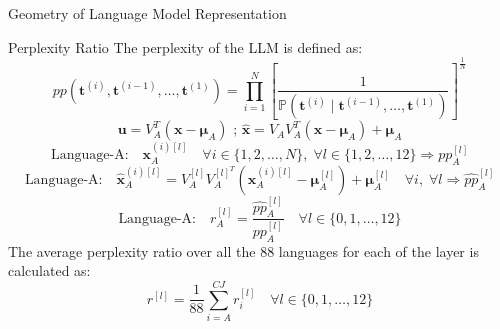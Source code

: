 \documentclass{beamer}
\begin{document}
	\begin{frame}{Geometry of Language Model Representation}
		\begin{block}{\scriptsize Perplexity Ratio}\scriptsize
			The perplexity of the LLM is defined as:
			\begin{equation}\label{E:pp}
				pp(\mathbf{t}^{(i)}, \mathbf{t}^{(i-1)}, \dots , \mathbf{t}^{(1)}) = \prod_{i = 1}^{N} \left[ \frac{1}{\mathbb{P}(\mathbf{t}^{(i)} \mid \mathbf{t}^{(i-1)}, \dots , \mathbf{t}^{(1)})} \right]^{\frac{1}{N}}
			\end{equation}		
			\begin{equation}
				\mathbf{u} = V_A^T(\mathbf{x} - \bm{\mu}_A) \text{    ;    } \hat{\mathbf{x}} = V_A V_A^T (\mathbf{x} - \bm{\mu}_A) + \bm{\mu}_A
			\end{equation}
			\begin{equation}
				\text{Language-A:} \quad \mathbf{x}_A^{(i)[l]} \quad \forall i \in \{1, 2, \dots, N\},\; \forall l \in \{1, 2, \dots, 12\} \Longrightarrow pp_A^{[l]} 
			\end{equation}
			\begin{equation}
				\text{Language-A:} \quad \hat{\mathbf{x}}_A^{(i)[l]} = V_A^{[l]} V_A^{[l]^T} (\mathbf{x}_A^{(i)[l]} - \bm{\mu}_A^{[l]}) + \bm{\mu}_A^{[l]}  \quad \forall i, \; \forall l \Longrightarrow \hat{pp}_{A}^{[l]}
			\end{equation}
			\begin{equation}
				\text{Language-A:} \quad r_A^{[l]} = \frac{\hat{pp}_A^{[l]}}{pp_A^{[l]}} \quad \forall l \in \{0, 1, \dots , 12\}
			\end{equation}
			The average perplexity ratio over all the 88 languages for each of the layer is calculated as:
			\begin{equation}
				r^{[l]} = \frac{1}{88} \sum_{i = A}^{CJ} r_i^{[l]} \quad \forall l \in \{0, 1, \dots , 12\}
			\end{equation}
		\end{block}
	\end{frame}
	
\end{document}
